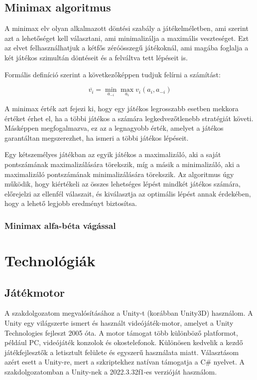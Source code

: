 \documentclass[
]{thesis-ekf}
\theoremstyle{definition}
\theoremstyle{remark}
\begin{document}
\section{Minimax algoritmus}

A minimax elv olyan alkalmazott döntési szabály a játékelméletben, ami szerint azt a lehetőséget kell választani, ami minimalizálja a maximális veszteséget. Ezt az elvet felhasználhatjuk a kétfős zéróösszegű játékoknál, ami magába foglalja a két játékos szimultán döntéseit és a felváltva tett lépéseit is. \cite{MiniMaxEnWiki}

Formális definíció szerint a következőképpen tudjuk felírni a számítást:

\begin{equation*}
\overline{v_{i}}=\underset{{a_{-i}}}{\min} \underset{{a_{i}}}{\max} v_{i}(a_{i}, a_{-i})
\end{equation*}

A minimax érték azt fejezi ki, hogy egy játékos legrosszabb esetben mekkora értéket érhet el, ha a többi játékos a számára legkedvezőtlenebb stratégiát követi. Másképpen megfogalmazva, ez az a legnagyobb érték, amelyet a játékos garantáltan megszerezhet, ha ismeri a többi játékos lépéseit. 

Egy kétszemélyes játékban az egyik játékos a maximalizáló, aki a saját pontszámának maximalizálására törekszik, míg a másik a minimalizáló, aki a maximalizáló pontszámának minimalizálására törekszik. Az algoritmus úgy működik, hogy kiértékeli az összes lehetséges lépést mindkét játékos számára, előrejelzi az ellenfél válaszait, és kiválasztja az optimális lépést annak érdekében, hogy a lehető legjobb eredményt biztosítsa. \cite{MiniMaxGfG}

\subsection{Minimax alfa-béta vágással}

\chapter{Technológiák}

\section{Játékmotor}

A szakdolgozatom megvalósításához a Unity-t (korábban Unity3D) használom. A Unity egy világszerte ismert és használt videójáték-motor, amelyet a Unity Technologies fejleszt 2005 óta. A motor támogat több különböző platformot, például PC, videójáték konzolok és okostelefonok. Különösen kedvelik a kezdő játékfejlesztők a letisztult felülete és egyszerű használata miatt. Választásom azért esett a Unity-re, mert a szkriptekhez natívan támogatja a C\# nyelvet. A szakdolgozatomban a Unity-nek a 2022.3.32f1-es verzióját használom.
\end{document}
